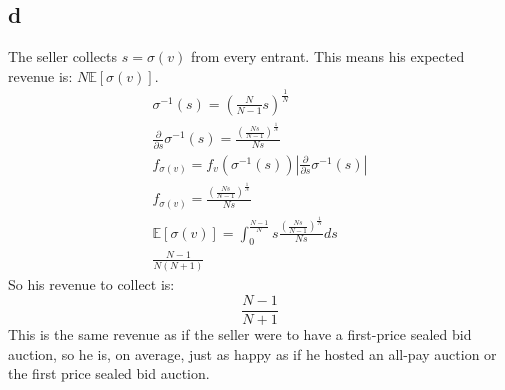 \documentclass[10pt]{paper}
\begin{document}
\subsection*{d}


The seller collects $s = \sigma(v)$ from every entrant. This means his
expected revenue is: $N \mathbb{E}[\sigma(v)]$.
\begin{align*}
  \sigma^{-1}(s) = \left ( \frac{N}{N-1} s \right )^{\frac{1}{N}}\\
  \frac{\partial}{\partial s} \sigma^{-1}(s) = \frac{\left(\frac{N s}{N - 1}\right)^{\frac{1}{N}}}{N s}\\
  f_{\sigma(v)} = f_v( \sigma^{-1}(s) ) \left | \frac{\partial}{\partial s} \sigma^{-1}(s) \right |\\
  f_{\sigma(v)} = \frac{\left(\frac{N s}{N - 1}\right)^{\frac{1}{N}}}{N s}\\
  \mathbb{E}[\sigma(v)] = \int_0^{\frac{N-1}{N}} s \frac{\left(\frac{N s}{N - 1}\right)^{\frac{1}{N}}}{N s} ds\\
  \frac{N-1}{N(N+1)}
\end{align*}
So his revenue to collect is:
$$\frac{N-1}{N+1}$$
This is the same revenue as if the seller were to have a first-price
sealed bid auction, so he is, on average, just as happy as if he
hosted an all-pay auction or the first price sealed bid auction.
\end{document}
